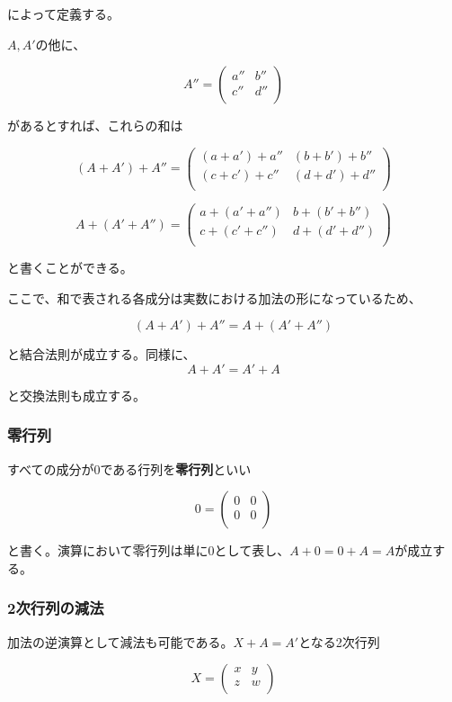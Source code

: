 \documentclass[dvipdfmx,autodetect-engine]{jsarticle}
\begin{document}
によって定義する。

$A,A'$の他に、

$$
A'' = \begin{pmatrix}
a'' & b'' \\
c'' & d'' \\
\end{pmatrix}
$$

があるとすれば、これらの和は

$$
(A + A') + A'' = \begin{pmatrix}
(a + a') + a'' & (b + b') + b'' \\
(c + c') + c'' & (d + d') + d'' \\
\end{pmatrix}
$$

$$
A + (A' + A'') = \begin{pmatrix}
a + (a' + a'') & b + (b' + b'') \\
c + (c' + c'') & d + (d' + d'') \\
\end{pmatrix}
$$

と書くことができる。

ここで、和で表される各成分は実数における加法の形になっているため、

$$
(A + A') + A'' = A + (A' + A'')
$$

と結合法則が成立する。同様に、
$$
A + A' = A' + A
$$

と交換法則も成立する。

\subsubsection{零行列}

すべての成分が0である行列を{\bf 零行列}といい

$$
0 = \begin{pmatrix}
0 & 0 \\
0 & 0 \\
\end{pmatrix}
$$

と書く。演算において零行列は単に$0$として表し、$A + 0 = 0 + A = A$が成立する。

\subsubsection{2次行列の減法}

加法の逆演算として減法も可能である。$X + A = A'$となる2次行列

$$
X = \begin{pmatrix}
x & y \\
z & w \\
\end{pmatrix}
$$
\end{document}
